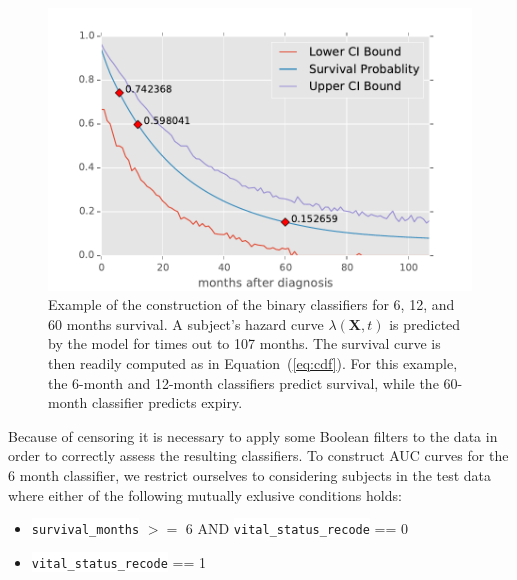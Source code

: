 \documentclass[10pt,letterpaper]{article}
\newcommand{\codewhite}[1]{\colorbox{white}{\texttt{#1}}}
\begin{document}
\begin{figure}[h]
\centering 
\begin{center}
\includegraphics[width=.90\textwidth,origin=c]{survivalexamplewitherrors.pdf}
\caption{\label{fig:survivalexample} Example of the construction of the binary classifiers for 6, 12, and 60 months survival.
A subject's hazard curve $\lambda(\mathbf{X}, t)$ is predicted by the model for times out to 107 months. The survival curve is then readily computed as in Equation~(\ref{eq:cdf}). For this example, the 6-month and 12-month classifiers predict survival, while the 60-month classifier predicts expiry.}
\end{center}
\end{figure}



Because of censoring it is necessary to apply some Boolean filters to the data in order to correctly assess the resulting classifiers.
To construct AUC curves for the 6 month classifier, we restrict ourselves to considering
subjects in the test data where either of the following mutually exlusive conditions holds:

\begin{itemize}[noitemsep]
\item \codewhite{survival\_months} $>=$ 6 AND \codewhite{vital\_status\_recode} == 0
\item \codewhite{vital\_status\_recode} == 1
\end{itemize}
\end{document}

